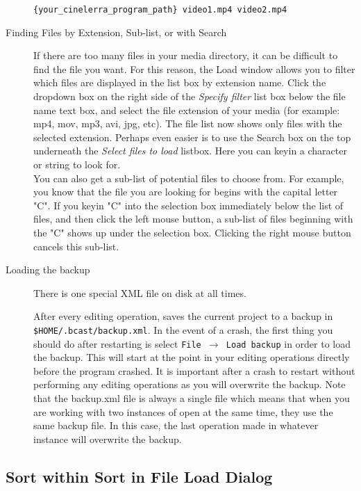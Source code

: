 \begin{description}
    \texttt{\{your\_cinelerra\_program\_path\} video1.mp4 video2.mp4}
    \item[Finding Files by Extension, Sub-list, or with Search] If there are too many files in your media directory, it can be difficult to find the file you want. For this reason, the Load window allows you to filter which files are displayed in the list box by extension name. Click the dropdown box on the right side of the \textit{Specify filter} list box below the file name text box, and select the file extension of your media (for example: mp4, mov, mp3, avi, jpg, etc). The file list now shows only files with the selected extension.  Perhaps even easier is to use the Search box on the top underneath the \textit{Select files to load} listbox.  Here you can keyin a character or string to look for. \\
    You can also get a sub-list of potential files to choose from. For example, you know that the file you are looking for begins with the capital letter "C". If you keyin "C" into the selection box immediately below the list of files, and then click the left mouse button, a sub-list of files beginning with the "C" shows up under the selection box. Clicking the right mouse button cancels this sub-list.
    \item[Loading the backup] There is one special XML file on disk at all times. 

        After every editing operation, \CGG{} saves the current project to a backup in  \texttt{\$HOME/.bcast/backup.xml}. 
        In the event of a crash, the first thing you should do after restarting \CGG{} is select \texttt{File $\rightarrow$ Load backup} in order to load the backup. 
        This will start \CGG{} at the point in your editing operations directly before the program crashed. 
        It is important after a crash to restart \CGG{} without performing any editing operations as you will overwrite the backup. 
        Note that the backup.xml file is always a single file which means that when you are working with two instances of \CGG{} open at the same time, they use the same backup file. 
        In this case, the last operation made in whatever instance will overwrite the backup.
\end{description}

\subsection{Sort within Sort in File Load Dialog}%
\label{sub:sort_within_sort_file_load_dialog}

